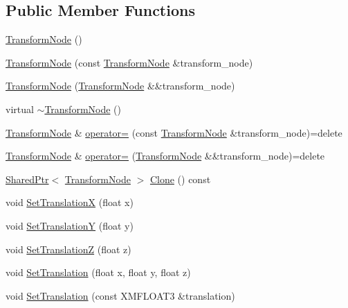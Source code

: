 \subsection*{Public Member Functions}
\begin{DoxyCompactItemize}
\item 
\hyperlink{classmage_1_1_transform_node_aec41a87ef5f7bca905e1de4b8959350a}{Transform\+Node} ()
\item 
\hyperlink{classmage_1_1_transform_node_a6ee41dcccf0aba7f904f1617444411d4}{Transform\+Node} (const \hyperlink{classmage_1_1_transform_node}{Transform\+Node} \&transform\+\_\+node)
\item 
\hyperlink{classmage_1_1_transform_node_ae9e2e7dafab6af1e4a400fa0b84eff35}{Transform\+Node} (\hyperlink{classmage_1_1_transform_node}{Transform\+Node} \&\&transform\+\_\+node)
\item 
virtual \hyperlink{classmage_1_1_transform_node_a0c5e84d99c27cda31dae8106611d682f}{$\sim$\+Transform\+Node} ()
\item 
\hyperlink{classmage_1_1_transform_node}{Transform\+Node} \& \hyperlink{classmage_1_1_transform_node_a1514dd4dc3ca63725ead2a196b2c6c89}{operator=} (const \hyperlink{classmage_1_1_transform_node}{Transform\+Node} \&transform\+\_\+node)=delete
\item 
\hyperlink{classmage_1_1_transform_node}{Transform\+Node} \& \hyperlink{classmage_1_1_transform_node_a48c94a56f7d6693a5b6ca61841084249}{operator=} (\hyperlink{classmage_1_1_transform_node}{Transform\+Node} \&\&transform\+\_\+node)=delete
\item 
\hyperlink{namespacemage_a1e01ae66713838a7a67d30e44c67703e}{Shared\+Ptr}$<$ \hyperlink{classmage_1_1_transform_node}{Transform\+Node} $>$ \hyperlink{classmage_1_1_transform_node_a634282d467c2f56558cc0d3fcafa2d87}{Clone} () const
\item 
void \hyperlink{classmage_1_1_transform_node_ae8c70df952ab17950a48decbc14ab09d}{Set\+TranslationX} (float x)
\item 
void \hyperlink{classmage_1_1_transform_node_a299fab4e618c7221569ebe65a7f8320e}{Set\+TranslationY} (float y)
\item 
void \hyperlink{classmage_1_1_transform_node_aa774136e2965eb5474d7cc326c3e987a}{Set\+TranslationZ} (float z)
\item 
void \hyperlink{classmage_1_1_transform_node_aadda64b3fecda3f19535c6cad6b03721}{Set\+Translation} (float x, float y, float z)
\item 
void \hyperlink{classmage_1_1_transform_node_a2e6a7a640f14c504601fe0ed614e8467}{Set\+Translation} (const X\+M\+F\+L\+O\+A\+T3 \&translation)

\end{DoxyCompactItemize}
